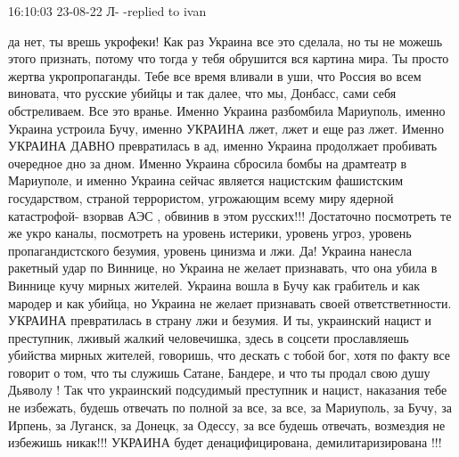  
 
 
 
 

16:10:03 23-08-22 Л- -replied to ivan

да нет, ты врешь укрофеки!
Как раз Украина все это сделала, но ты не можешь этого признать, потому
что тогда у тебя обрушится вся картина мира. Ты просто жертва укропропаганды. Тебе все
время вливали в уши, что Россия во всем виновата, что русские убийцы и так далее, что мы, Донбасс,
сами себя обстреливаем. Все
это вранье. Именно Украина разбомбила Мариуполь, именно Украина устроила Бучу, именно
УКРАИНА лжет, лжет и еще раз лжет. Именно УКРАИНА ДАВНО превратилась в ад, именно Украина
продолжает пробивать очередное дно за дном. Именно Украина сбросила бомбы на
драмтеатр в Мариуполе, и именно Украина сейчас является нацистским фашистским
государством, страной террористом, угрожающим всему миру ядерной катастрофой- взорвав АЭС , обвинив в этом русских!!!
Достаточно посмотреть те же укро каналы, посмотреть на
уровень истерики, уровень угроз, уровень пропагандистского безумия, уровень
цинизма и лжи. Да! Украина нанесла ракетный удар по Виннице, но Украина не желает
признавать, что она убила в Виннице кучу мирных жителей. Украина вошла в Бучу как
грабитель и как мародер и как убийца, но Украина не желает признавать своей
ответстветнности. УКРАИНА превратилась в страну лжи и безумия. И ты, украинский
нацист и преступник, лживый жалкий человечишка, здесь в соцсети прославляешь
убийства мирных жителей, говоришь, что дескать с тобой бог, хотя по факту все
говорит о том, что ты служишь Сатане, Бандере, и что ты продал свою душу Дьяволу !
Так
что украинский подсудимый преступник и нацист, наказания тебе не избежать,
будешь отвечать по полной за все, за все, за Мариуполь, за Бучу, за Ирпень, за
Луганск, за Донецк, за Одессу, за все будешь отвечать, возмездия не избежишь
никак!!!
УКРАИНА будет денацифицирована, демилитаризирована !!!
